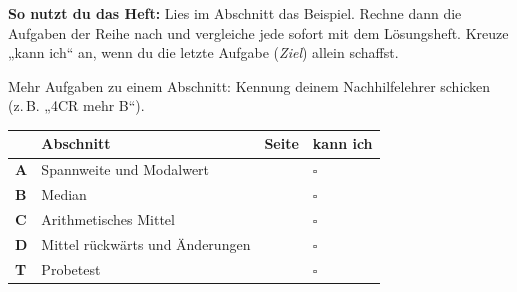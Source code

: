\documentclass[11pt]{article}
\begin{document}
\par\smallskip
{}\par\medskip
\noindent\textbf{So nutzt du das Heft:} Lies im Abschnitt das Beispiel. Rechne dann die Aufgaben der Reihe nach und vergleiche jede sofort mit dem Lösungsheft. Kreuze „kann ich“ an, wenn du die letzte Aufgabe (\emph{Ziel}) allein schaffst.\par
\noindent Mehr Aufgaben zu einem Abschnitt: Kennung deinem Nachhilfelehrer schicken (z.\,B. „4CR mehr B“).\par\medskip
{\renewcommand{\arraystretch}{1.3}
\noindent\begin{tabular}{|>{\bfseries}p{10mm}|p{112mm}|>{\raggedleft\arraybackslash}p{10mm}|>{\centering\arraybackslash}p{14mm}|}\hline
\rowcolor{black!8} & \textbf{Abschnitt} & \textbf{Seite} & \textbf{kann ich}\\\hline
A & Spannweite und Modalwert & \pageref{s:A} & $\square$\\\hline
B & Median & \pageref{s:B} & $\square$\\\hline
C & Arithmetisches Mittel & \pageref{s:C} & $\square$\\\hline
D & Mittel rückwärts und Änderungen & \pageref{s:D} & $\square$\\\hline
T & Probetest & \pageref{s:T} & $\square$\\\hline
\end{tabular}}\par\bigskip
\end{document}
